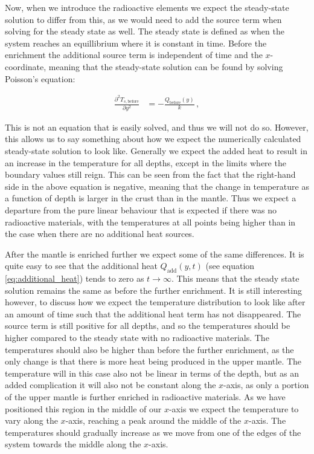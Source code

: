 \documentclass[reprint,english,notitlepage]{revtex4-1}  %
\begin{document}
Now, when we introduce the radioactive elements we expect the steady-state solution to differ from this, as we would need to add the source term when solving for the steady state as well. The steady state is defined as when the system reaches an equillibrium where it is constant in time. Before the enrichment the additional source term is independent of time and the $x$-coordinate, meaning that the steady-state solution can be found by solving Poisson's equation:

\begin{align*}
\frac{\partial^2 T_{s,\text{before}}}{\partial y^2} &= -\frac{Q_{\text{before}}(y)}{k} \, , 
\end{align*} 

This is not an equation that is easily solved, and thus we will not do so. However, this allows us to say something about how we expect the numerically calculated steady-state solution to look like. Generally we expect the added heat to result in an increase in the temperature for all depths, except in the limits where the boundary values still reign. This can be seen from the fact that the right-hand side in the above equation is negative, meaning that the change in temperature as a function of depth is larger in the crust than in the mantle. Thus we expect a departure from the pure linear behaviour that is expected if there was no radioactive materials, with the temperatures at all points being higher than in the case when there are no additional heat sources.

After the mantle is enriched further we expect some of the same differences. It is quite easy to see that the additional heat $Q_{\text{add}}(y,t)$ (see equation \eqref{eq:additional_heat}) tends to zero as $t\to \infty$. This means that the steady state solution remains the same as before the further enrichment. It is still interesting however, to discuss how we expect the temperature distribution to look like after an amount of time such that the additional heat term has not disappeared. The source term is still positive for all depths, and so the temperatures should be higher compared to the steady state with no radioactive materials. The temperatures should also be higher than before the further enrichment, as the only change is that there is more heat being produced in the upper mantle. The temperature will in this case also not be linear in terms of the depth, but as an added complication it will also not be constant along the $x$-axis, as only a portion of the upper mantle is further enriched in radioactive materials. As we have positioned this region in the middle of our $x$-axis we expect the temperature to vary along the $x$-axis, reaching a peak around the middle of the $x$-axis. The temperatures should gradually increase as we move from one of the edges of the system towards the middle along the $x$-axis. 
\end{document}
